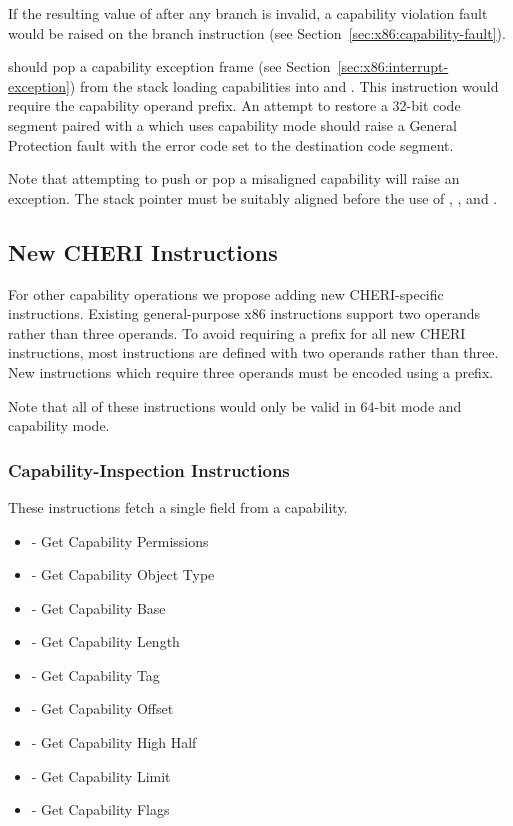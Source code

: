 If the resulting value of \CIP{} after any branch
is invalid, a capability violation fault would be raised on the branch
instruction (see Section~\ref{sec:x86:capability-fault}).

 should pop a capability exception frame (see
Section~\ref{sec:x86:interrupt-exception}) from the stack loading
capabilities into \CIP{} and \CSP{}.  This instruction would require
the capability operand prefix.  An attempt to restore a 32-bit code
segment paired with a \CIP{} which uses capability mode should raise a
General Protection fault with the error code set to the destination
code segment.

Note that attempting to push or pop a misaligned capability will raise
an exception.  The stack pointer must be suitably aligned before the
use of , , and .

\subsection{New CHERI Instructions}

For other capability operations we
propose adding new CHERI-specific instructions.
Existing general-purpose x86 instructions support two operands rather
than three operands.  To avoid requiring a \VEX{} prefix for all new
CHERI instructions, most instructions are defined with two operands
rather than three.  New instructions which require three operands must
be encoded using a \VEX{} prefix.

Note that all of these instructions would only be valid in 64-bit mode
and capability mode.

\subsubsection{Capability-Inspection Instructions}

These instructions fetch a single field from a capability.

\begin{itemize}
  \item {} - Get Capability Permissions
  \item {} - Get Capability Object Type
  \item {} - Get Capability Base
  \item {} - Get Capability Length
  \item {} - Get Capability Tag
  \item {} - Get Capability Offset
  \item {} - Get Capability High Half
  \item {} - Get Capability Limit
  \item {} - Get Capability Flags
\end{itemize}

